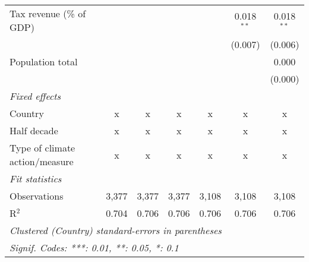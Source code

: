 \begin{tabular}{lcccccc}
   Tax revenue (\% of GDP)                                        &              &                &                &                & 0.018$^{**}$   & 0.018$^{**}$\\   
                                                                  &              &                &                &                & (0.007)        & (0.006)\\   
   Population total                                               &              &                &                &                &                & 0.000\\   
                                                                  &              &                &                &                &                & (0.000)\\   
   \emph{Fixed effects}\\
   Country                                                        & x            & x              & x              & x              & x              & x\\  
   Half decade                                                    & x            & x              & x              & x              & x              & x\\  
   Type of climate action/measure                                 & x            & x              & x              & x              & x              & x\\  
   \midrule \emph{Fit statistics}\\
   Observations                                                   & 3,377        & 3,377          & 3,377          & 3,108          & 3,108          & 3,108\\  
   R$^2$                                                          & 0.704        & 0.706          & 0.706          & 0.706          & 0.706          & 0.706\\  
   \midrule
   \multicolumn{7}{l}{\emph{Clustered (Country) standard-errors in parentheses}}\\
   \multicolumn{7}{l}{\emph{Signif. Codes: ***: 0.01, **: 0.05, *: 0.1}}\\
\end{tabular}
\par\endgroup


